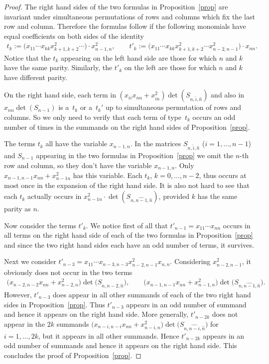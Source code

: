 \documentclass[pdftex]{sigma}
\numberwithin{equation}{section}
\begin{document}
\begin{proof} The right hand sides of the two formulas in Proposition~\ref{prop} are invariant under simultaneous permutations of rows and columns which fix the last row and column. Therefore the formulas follow if the following monomials have equal coefficients on both sides of the identity
\begin{gather*}
t_k:=\big(x_{11}\cdots x_{kk}x_{k+1,k+2}^2\cdots\big)\cdot x_{n-1,n}^2,\qquad
t'_k:=\big(x_{11}\cdots x_{kk}x_{k+1,k+2}^2\cdots x_{n-2,n-1}^2\big)\cdot x_{nn}.
\end{gather*}
Notice that the $t_k$ appearing on the left hand side are those for which $n$ and $k$ have the same parity. Similarly, the $t'_k$ on the left are those for which $n$ and $k$ have different parity.

On the right hand side, each term in $(x_{ii}x_{nn}+x_{in}^2)\det(S_{n,\widehat{i},\hat{n}})$ and also in $x_{nn}\det(S_{n-1})$ is a~$t_k$ or a~$t_k'$ up to simultaneous permutation of rows and columns. So we only need to verify that each term of type~$t_k$ occurs an odd number of times in the summands on the right hand sides of Proposition~\ref{prop}.

The terms $t_k$ all have the variable $x_{n-1,n}$. In the matrices $S_{n,\hat{i},\hat{n}}$ ($i=1,\ldots,n-1$) and $S_{n-1}$ appearing in the two formulas in Proposition~\ref{prop} we omit the $n$-th row and column, so they don't have the variable $x_{n-1,n}$. Only $x_{n-1,n-1}x_{nn}+x_{n-1 n}^2$ has this variable. Each $t_k$, $k=0,\ldots, n-2$, thus occurs at most once in the expansion of the right hand side. It is also not hard to see that each $t_k$ actually occurs in $x_{n-1 n}^2\cdot \det(S_{n,\widehat{n-1},\hat{n}})$, provided $k$ has the same parity as $n$.

Now consider the terms $t'_k$. We notice first of all that $t'_{n-1}=x_{11}\cdots x_{nn}$ occurs in all terms on the right hand side of each of the two formulas in Proposition~\ref{prop} and since the two right hand sides each have an odd number of terms, it survives.

Next we consider $t'_{n-3}=x_{11}\cdots x_{n-3,n-3} x_{n-2,n-1}^2 x_{n,n}$. Considering $x_{n-2,n-1}^2$, it obviously does not occur in the two terms
\begin{gather*}
\big(x_{n-2,n-2}x_{nn}+x_{n-2,n}^2\big)\det\big(S_{n,\widehat{n-2},\hat{n}}\big),\qquad
\big(x_{n-1,n-1}x_{nn}+x_{n-1,n}^2\big)\det\big(S_{n,\widehat{n-1},\hat{n}}\big).
\end{gather*}
However, $t'_{n-3}$ does appear in all other summands of each of the two right hand sides in Proposition~\ref{prop}. Thus $t'_{n-3}$ appears in an odd number of summand and hence it appears on the right hand side. More generally, $t'_{n-2k}$ does not appear in the $2k$ summands $\big(x_{n-i,n-i}x_{nn}+ x_{n-i,n}^2\big)\det\big(S_{n,\widehat{n-i},\hat{n}}\big)$ for $i=1,\ldots,2k$, but it appears in all other summands. Hence $t'_{n-2k}$ appears in an odd number of summands and hence it appears on the right hand side. This concludes the proof of Proposition~\ref{prop}.
\end{proof}
\end{document}

